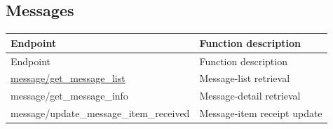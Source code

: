 \subsection{Messages}

\begin{longtable}{>{\ttfamily}p{}p{}}
\toprule
Endpoint & Function description \\
\midrule
\endfirsthead%

\toprule
Endpoint & Function description \\
\midrule
\endhead%

\hyperref[subsec:api_message_get_message_list]
    {message/get\_message\_list}
    & Message-list retrieval \\

message/get\_message\_info
    & Message-detail retrieval \\

message/update\_message\_item\_received
    & Message-item receipt update \\

\bottomrule
\end{longtable}